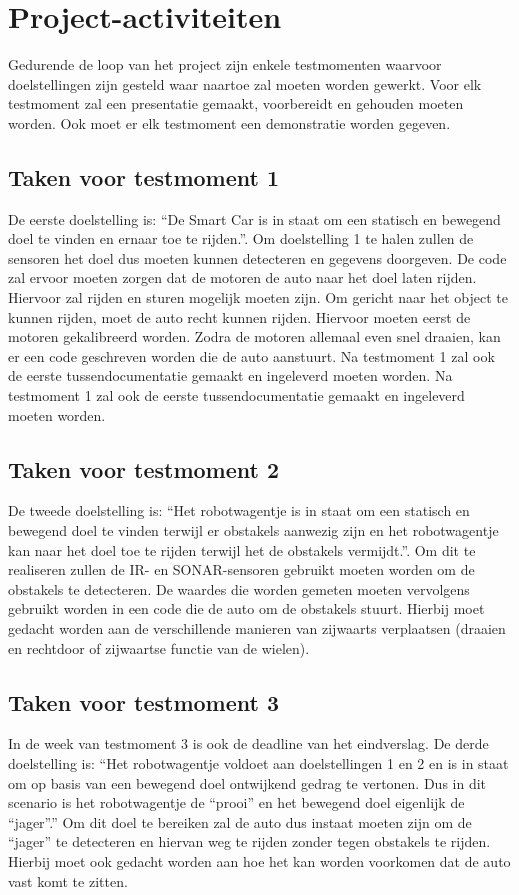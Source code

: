 \section{Project-activiteiten}
Gedurende de loop van het project zijn enkele testmomenten waarvoor doelstellingen zijn gesteld waar naartoe zal moeten worden gewerkt. Voor elk testmoment zal een presentatie gemaakt, voorbereidt en gehouden moeten worden. Ook moet er elk testmoment een demonstratie worden gegeven.

\subsection{Taken voor testmoment 1}
De eerste doelstelling is: “De Smart Car is in staat om een statisch en bewegend doel te vinden en ernaar toe te rijden.”. Om doelstelling 1 te halen zullen de sensoren het doel dus moeten kunnen detecteren en gegevens doorgeven. De code zal ervoor moeten zorgen dat de motoren de auto naar het doel laten rijden. Hiervoor zal rijden en sturen mogelijk moeten zijn. Om gericht naar het object te kunnen rijden, moet de auto recht kunnen rijden. Hiervoor moeten eerst de motoren gekalibreerd worden. Zodra de motoren allemaal even snel draaien, kan er een code geschreven worden die de auto aanstuurt. Na testmoment 1 zal ook de eerste tussendocumentatie gemaakt en ingeleverd moeten worden.
Na testmoment 1 zal ook de eerste tussendocumentatie gemaakt en ingeleverd moeten worden. 

\subsection{Taken voor testmoment 2}
De tweede doelstelling is: “Het robotwagentje is in staat om een statisch en bewegend doel te vinden terwijl er obstakels aanwezig zijn en het robotwagentje kan naar het doel toe te rijden terwijl het de obstakels vermijdt.”. Om dit te realiseren zullen de IR- en SONAR-sensoren gebruikt moeten worden om de obstakels te detecteren. De waardes die worden gemeten moeten vervolgens gebruikt worden in een code die de auto om de obstakels stuurt. Hierbij moet gedacht worden aan de verschillende manieren van zijwaarts verplaatsen (draaien en rechtdoor of zijwaartse functie van de wielen).

\subsection{Taken voor testmoment 3}
In de week van testmoment 3 is ook de deadline van het eindverslag. De derde doelstelling is: “Het robotwagentje voldoet aan doelstellingen 1 en 2 en is in staat om op basis van een bewegend doel ontwijkend gedrag te vertonen. Dus in dit scenario is het robotwagentje de “prooi” en het bewegend doel eigenlijk de “jager”.” Om dit doel te bereiken zal de auto dus instaat moeten zijn om de “jager” te detecteren en hiervan weg te rijden zonder tegen obstakels te rijden. Hierbij moet ook gedacht worden aan hoe het kan worden voorkomen dat de auto vast komt te zitten.


